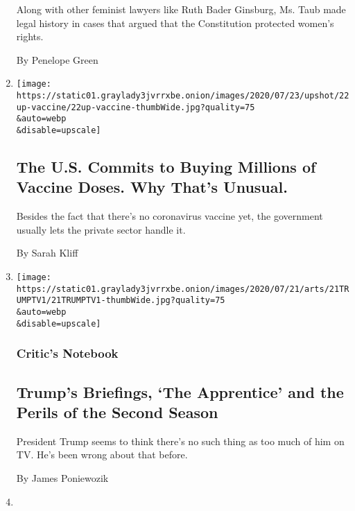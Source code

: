 \begin{enumerate}
  Along with other feminist lawyers like Ruth Bader Ginsburg, Ms. Taub
  made legal history in cases that argued that the Constitution
  protected women's rights.

  By Penelope Green
\item
  \href{/2020/07/22/upshot/vaccine-coronavirus-government-purchase.html}{}

  \texttt{[image: https://static01.graylady3jvrrxbe.onion/images/2020/07/23/upshot/22up-vaccine/22up-vaccine-thumbWide.jpg?quality=75\\\&auto=webp\\\&disable=upscale]}

  \hypertarget{the-us-commits-to-buying-millions-of-vaccine-doses-why-thats-unusual}{%
  \subsection{The U.S. Commits to Buying Millions of Vaccine Doses. Why
  That's
  Unusual.}\label{the-us-commits-to-buying-millions-of-vaccine-doses-why-thats-unusual}}

  Besides the fact that there's no coronavirus vaccine yet, the
  government usually lets the private sector handle it.

  By Sarah Kliff
\item
  \href{/2020/07/21/arts/television/trump-briefings.html}{}

  \texttt{[image: https://static01.graylady3jvrrxbe.onion/images/2020/07/21/arts/21TRUMPTV1/21TRUMPTV1-thumbWide.jpg?quality=75\\\&auto=webp\\\&disable=upscale]}

  \hypertarget{critics-notebook}{%
  \subsubsection{Critic's Notebook}\label{critics-notebook}}

  \hypertarget{trumps-briefings-the-apprentice-and-the-perils-of-the-second-season}{%
  \subsection{Trump's Briefings, `The Apprentice' and the Perils of the
  Second
  Season}\label{trumps-briefings-the-apprentice-and-the-perils-of-the-second-season}}

  President Trump seems to think there's no such thing as too much of
  him on TV. He's been wrong about that before.

  By James Poniewozik
\item
  \href{/2020/07/13/us/politics/coronavirus-health-insurance-trump.html}{}


\end{enumerate}
